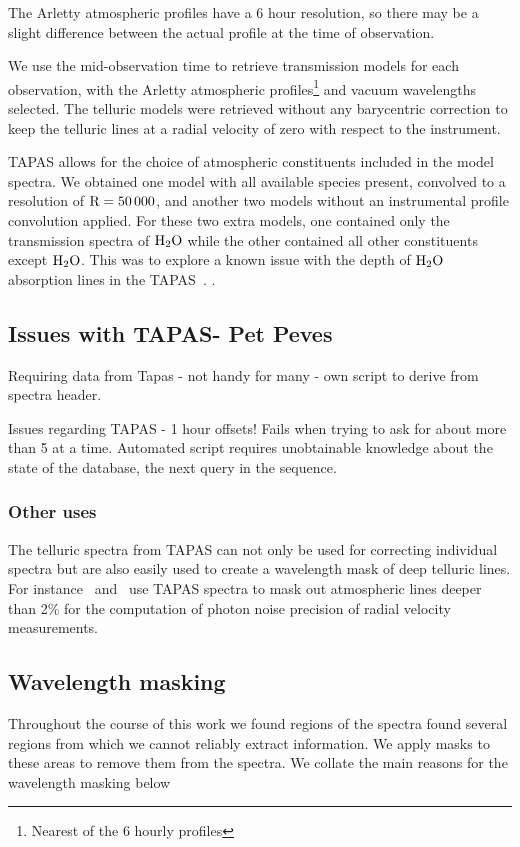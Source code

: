 The Arletty atmospheric profiles have a 6 hour resolution, so there may be a slight difference between the actual profile at the time of observation.

We use the mid-observation time to retrieve transmission models for each observation, with the Arletty atmospheric profiles\footnote{Nearest of the 6 hourly profiles} and vacuum wavelengths selected. The telluric models were retrieved without any barycentric correction to keep the telluric lines at a radial velocity of zero with respect to the instrument.

TAPAS allows for the choice of atmospheric constituents included in the model spectra. We obtained one model with all available species present, convolved to a resolution of \(\rm R=50\,000 \), and another two models without an instrumental profile convolution applied. For these two extra models, one contained only the transmission spectra of \(\rm H_{2}O \) while the other contained all other constituents except \(\rm H_{2}O \). This was to explore a known issue with the depth of \(\rm H_{2}O \) absorption lines in the TAPAS~\citet{bertaux_tapas_2014}. .


\subsection{Issues with TAPAS-  Pet Peves}
Requiring data from Tapas
- not handy for many
- own script to derive from spectra header.

Issues regarding TAPAS - 1 hour offsets!
Fails when trying to ask for about more than 5 at a time.
Automated script requires unobtainable knowledge about the state of the database, the next query in the sequence.



\subsubsection{Other uses}
The telluric spectra from TAPAS can not only be used for correcting individual spectra but are also easily used to create a wavelength mask of deep telluric lines. For instance~\citet{figueira_radial_2016} and~\citet{artigau_optical_2018} use TAPAS spectra to mask out atmospheric lines deeper than 2\% for the computation of photon noise precision of radial velocity measurements.


\subsection{Wavelength masking}
Throughout the course of this work we found regions of the spectra found several regions from which we cannot reliably extract information.
We apply masks to these areas to remove them from the spectra. We collate the main reasons for the wavelength masking below

